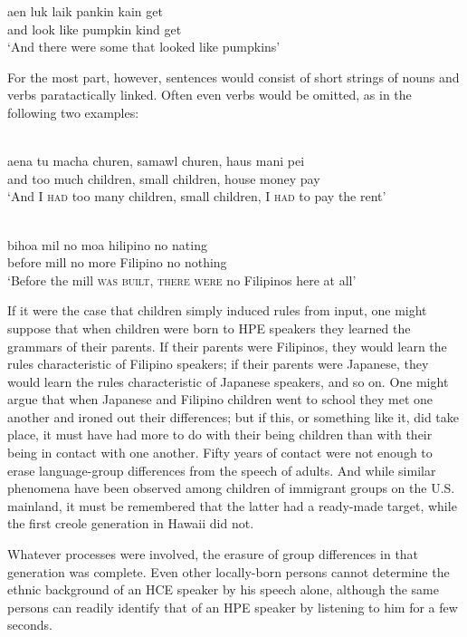 \ea\label{ex:14}
\gll aen luk laik pankin kain get\\
and look like pumpkin kind get \\
\glt  `And there were some that looked like pumpkins'
\z

For the most part, however, sentences would consist of short strings of nouns and verbs paratactically linked. Often even verbs would be omitted, as in the following two examples:

\ea\label{ex:15}
\\
\gll aena tu macha churen, samawl churen, haus mani pei\\
and too much children, small children, house money pay\\
\glt `And I \textsc{had} too many children, small children, I \textsc{had} to pay the rent'
\z

\ea\label{ex:16}
\\
\gll bihoa mil no moa hilipino no nating\\
before mill no more Filipino no nothing\\ 
\glt  `Before the mill \textsc{was built, there were} no Filipinos here at all' 
\z

If it were the case that children simply induced rules from input, one might suppose that when children were born to HPE speakers they learned the grammars of their parents. If their parents were Filipinos, they would learn the rules characteristic of Filipino speakers; if their parents were Japanese, they would learn the rules characteristic of Japanese speakers, and so on. One might argue that when Japanese and Filipino children went to school they met one another and ironed out their differences; but if this, or something like it, did take place, it must have had more to do with their being children than with their being in contact with one another. Fifty years of contact were not enough to erase language-group differences from the speech of adults. And while similar phenomena have been observed among children of immigrant groups on the U.S. mainland, it must be remembered that the latter had a ready-made target, while the first creole generation in Hawaii did not.

Whatever processes were involved, the erasure of group differences in that generation was complete. Even other locally-born persons cannot determine the ethnic background of an HCE speaker by his speech alone, although the same persons can readily identify that of an HPE speaker by listening to him for a few seconds.

